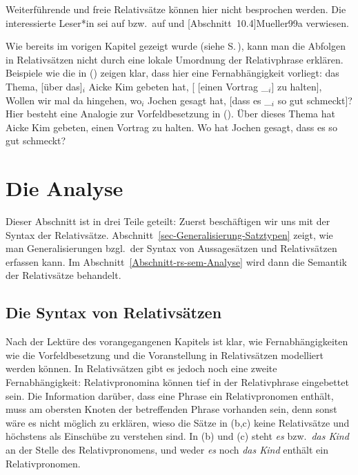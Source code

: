 \noindent
Weiterführende und freie Relativsätze können hier nicht besprochen werden. Die interessierte Leser*in
sei auf  bzw.\ auf  und [Abschnitt~10.4]{Mueller99a} verwiesen.

Wie bereits im vorigen Kapitel gezeigt wurde (siehe S.\,\pageref{bsp-nla-rs}), 
kann man die Abfolgen in Relativsätzen nicht durch
eine lokale Umordnung der Relativphrase erklären. Beispiele wie die in () zeigen
klar, dass hier eine Fernabhängigkeit vorliegt:
\eal
\ex das Thema, [über das]$_i$ Aicke Kim gebeten hat, [ [einen Vortrag \_$_i$] zu halten],
\ex Wollen wir mal da hingehen, wo$_i$ Jochen gesagt hat, [dass es \_$_i$ so gut schmeckt]?
\zl
Hier besteht eine Analogie zur Vorfeldbesetzung in ().
\eal
\ex Über dieses Thema hat Aicke Kim gebeten, einen Vortrag zu halten.
\ex Wo hat Jochen gesagt, dass es so gut schmeckt?
\zl



\section{Die Analyse}
\label{sec-rs-anal}

Dieser Abschnitt ist in drei Teile geteilt: Zuerst beschäftigen wir uns
mit der Syntax der Relativsätze. Abschnitt~\ref{sec-Generalisierung-Satztypen} zeigt, wie man Generalisierungen bzgl.\ der Syntax
von Aussagesätzen und Relativsätzen erfassen kann. Im Abschnitt~\ref{Abschnitt-rs-sem-Analyse} wird
dann die Semantik der Relativsätze behandelt.

\subsection{Die Syntax von Relativsätzen}
\label{sec-syntax-rs}
\label{lp-rs}%

Nach der Lektüre des vorangegangenen Kapitels ist klar, wie Fernabhängigkeiten wie \zb die
Vorfeldbesetzung und die Voranstellung in Relativsätzen modelliert werden können. In Relativsätzen gibt
es jedoch noch eine zweite Fernabhängigkeit: Relativpronomina können tief in der Relativphrase
eingebettet sein. Die Information darüber, dass eine Phrase ein Relativpronomen enthält, muss
am obersten Knoten der betreffenden Phrase vorhanden sein, denn sonst wäre es nicht möglich zu erklären,
wieso die Sätze in (b,c) keine Relativsätze und höchstens als Einschübe zu verstehen sind.
\eal
{}
\zl
In (b) und (c) steht \emph{es} bzw.\ \emph{das Kind} an der Stelle des
Relativpronomens, und weder \emph{es} noch \emph{das Kind} enthält ein Relativpronomen.

